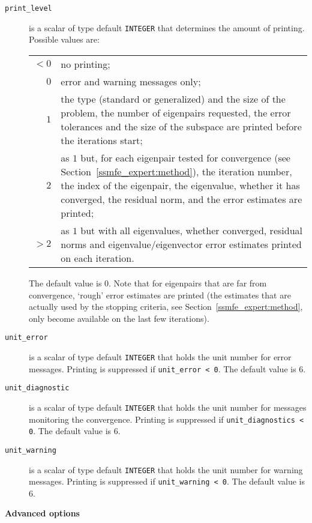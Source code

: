 \begin{description}
%
\item[\texttt{print\_level}] is a scalar of type default \texttt{INTEGER} that
determines the amount of printing.
Possible values are:\\
%
\begin{tabular}{r@{ : }p{}}
$<0$ & no printing;\\
$0$ & error and warning messages only;\\
$1$ & the type (standard or generalized) and the size of the problem,
   the number of eigenpairs requested, the error tolerances and
   the size of the subspace are printed before the iterations start;\\
$2$ & as $1$ but, for each eigenpair tested for convergence
   (see Section~\ref{ssmfe_expert:method}), the iteration number, the index of 
   the eigenpair, the eigenvalue, whether it has converged, the residual norm,
   and the error estimates are printed;\\
$>2$ & as $1$ but with all eigenvalues, whether converged, residual norms
   and eigenvalue/eigenvector error estimates printed on each iteration. 
\end{tabular}

\noindent
The default value is 0.
Note that for eigenpairs that are far from convergence,
`rough' error estimates are printed
(the estimates that are actually used by the stopping criteria,
see Section~\ref{ssmfe_expert:method}, only become available on the last few
iterations).
%
\item[\texttt{unit\_error}] is a scalar of type default \texttt{INTEGER} that
holds the unit number for error messages.
Printing is suppressed if {\tt unit\_error < 0}.
The default value is 6. 
%
\item[\texttt{unit\_diagnostic}] is a scalar of type default \texttt{INTEGER} that
holds the unit number for messages  monitoring the convergence.
Printing is suppressed if {\tt unit\_diagnostics < 0}.
The default value is 6. 
%
\item[\texttt{unit\_warning}] is a scalar of type default \texttt{INTEGER} that
holds the unit number for warning messages.
Printing is suppressed if {\tt unit\_warning < 0}.
The default value is 6. 
%
\end{description}

\medskip
\noindent
{\bf Advanced options}

